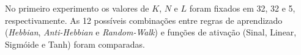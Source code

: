 \documentclass[12pt]{article}
\newcommand{\bits}{\textit{bits}\xspace}
\begin{document}


            
            No primeiro experimento os valores de $K$, $N$ e $L$ foram fixados em 32, 32 e 5, respectivamente. As 12 possíveis combinações entre regras de aprendizado (\textit{Hebbian}, \textit{Anti-Hebbian} e \textit{Random-Walk}) e funções de ativação (Sinal, Linear, Sigmóide e Tanh) foram comparadas.
            


\end{document}
